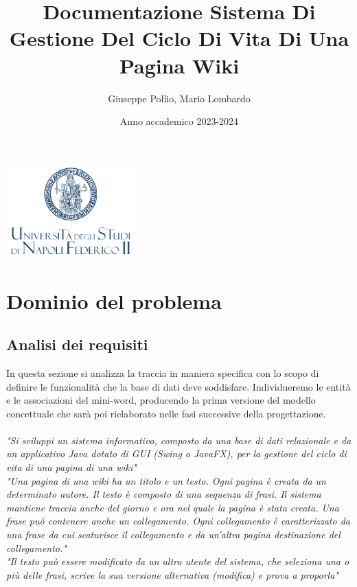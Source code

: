 \documentclass{article}
\title{Documentazione Sistema Di Gestione Del Ciclo Di Vita Di Una Pagina Wiki}
\author{Giuseppe Pollio, Mario Lombardo}
\date{Anno accademico 2023-2024}
\renewcommand{\maketitle}{%
	\begin{titlepage}
		\centering
		\includegraphics[width=5cm]{logo_uni.png}\par\vspace{1cm}
		\huge\bfseries\thetitle\par
		\vspace{1cm}
		\Large\theauthor\par
		\vfill
		\large\thedate\par
	\end{titlepage}
}
\begin{document}
	
	\maketitle
	
	\tableofcontents
	
	\newpage
	
	\section{Dominio del problema}
		\subsection{Analisi dei requisiti}
		In questa sezione si analizza la traccia in maniera specifica con lo scopo di definire le funzionalità
		che la base di dati deve soddisfare. Individueremo le entità e le associazioni
		del mini-word, producendo la prima versione del modello concettuale che
		sarà poi rielaborato nelle fasi successive della progettazione.\\ \\
		{\itshape "Si sviluppi un sistema informativo, composto da una base di dati relazionale e da un applicativo Java dotato
			di GUI (Swing o JavaFX), per la gestione del ciclo di vita di una pagina di una wiki"}
		\vspace{0.5cm}
		\\
		{\itshape "Una pagina di una wiki ha un titolo e un testo. Ogni pagina è creata da un determinato autore. Il testo è
			composto di una sequenza di frasi. Il sistema mantiene traccia anche del giorno e ora nel quale la pagina è
			stata creata. Una frase può contenere anche un collegamento. Ogni collegamento è caratterizzato da una
			frase da cui scaturisce il collegamento e da un’altra pagina destinazione del collegamento."}
		\vspace{0.5cm}
		\\
		{\itshape "Il testo può essere modificato da un altro utente del sistema, che seleziona una o più delle frasi, scrive la sua	
			versione alternativa (modifica) e prova a proporla"}
		\vspace{0.5cm}
		
\end{document}
